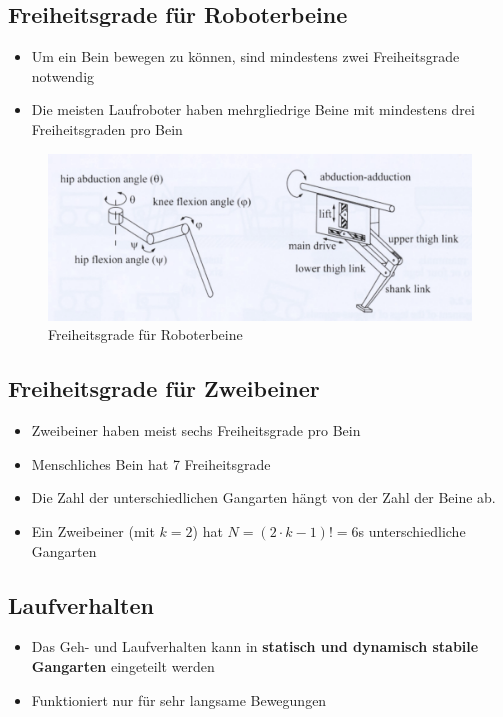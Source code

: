 \subsection{Freiheitsgrade für Roboterbeine}
\begin{itemize}
	\item Um ein Bein bewegen zu können, sind mindestens zwei Freiheitsgrade notwendig
	\item Die meisten Laufroboter haben mehrgliedrige Beine mit mindestens drei Freiheitsgraden pro Bein
\end{itemize}
\begin{figure}[H]
	\begin{center}
		\includegraphics[scale=0.5]{Resources/PNG/RoboterFreiheitsgrade.PNG}
		\caption{Freiheitsgrade für Roboterbeine}
		\label{fig:Resources/PNG/RoboterFreiheitsgrade.PNG}
	\end{center}
\end{figure}
\subsection{Freiheitsgrade für Zweibeiner}
\begin{itemize}
	\item Zweibeiner haben meist sechs Freiheitsgrade pro Bein
	\item Menschliches Bein hat 7 Freiheitsgrade
	\item Die Zahl der unterschiedlichen Gangarten hängt von der Zahl der Beine ab.
	\item Ein Zweibeiner (mit $k=2$) hat $N = (2 \cdot k - 1)! = 6$s unterschiedliche Gangarten
\end{itemize}
\subsection{Laufverhalten}
\begin{itemize}
	\item Das Geh- und Laufverhalten kann in \textbf{statisch und dynamisch stabile Gangarten} eingeteilt werden 
	\item Funktioniert nur für sehr langsame Bewegungen
\end{itemize}
